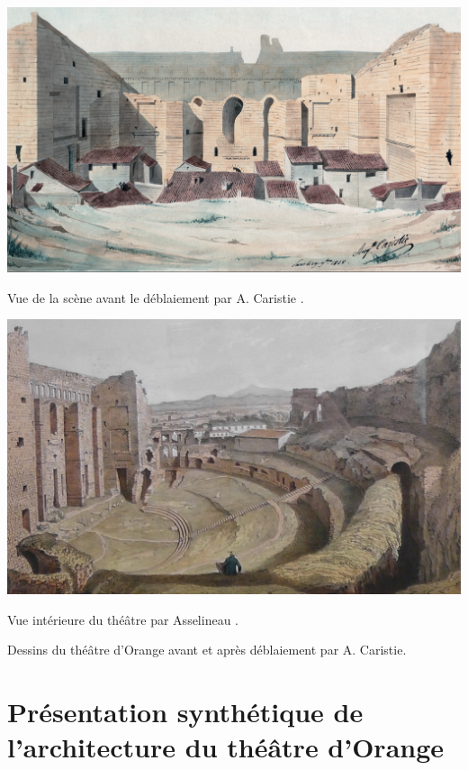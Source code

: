 		
\begin{figureth}
	\begin{subfigureth}{0.49\textwidth}
		\includegraphics[width=\linewidth]{images/av_deblaiement}
		\caption{Vue de la scène avant le déblaiement par A. Caristie \footnotemark.}
		\label{av_deblaiement}
	\end{subfigureth}
	\begin{subfigureth}{0.47\textwidth}
		\includegraphics[width=\linewidth]{images/asselineau}
		\caption{Vue intérieure du théâtre par Asselineau \footnotemark.}
	\end{subfigureth}
	\caption[Théâtre d'Orange avant restauration]{Dessins du théâtre d'Orange avant et après déblaiement par A. Caristie.}		
\end{figureth}		
\addtocounter{footnote}{-1}
\addtocounter{footnote}{1}
		
	\chapter{Présentation synthétique de l'architecture du théâtre d'Orange}
		\minitoc
		\newpage
		
